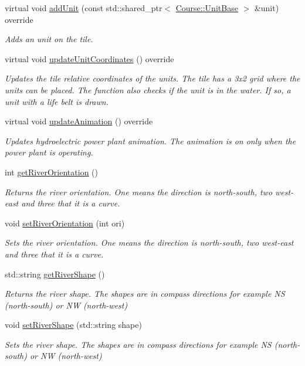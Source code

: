 \begin{DoxyCompactItemize}
virtual void \hyperlink{class_student_1_1_river_a93fc1bbc79e0f918d8f8b2e9455709d3}{add\-Unit} (const std\-::shared\-\_\-ptr$<$ \hyperlink{class_course_1_1_unit_base}{Course\-::\-Unit\-Base} $>$ \&unit) override
\begin{DoxyCompactList}\small\item\em Adds an unit on the tile. \end{DoxyCompactList}\item 
virtual void \hyperlink{class_student_1_1_river_aaf133bf15078e138b4b716a45fa67007}{update\-Unit\-Coordinates} () override
\begin{DoxyCompactList}\small\item\em Updates the tile relative coordinates of the units. The tile has a 3x2 grid where the units can be placed. The function also checks if the unit is in the water. If so, a unit with a life belt is drawn. \end{DoxyCompactList}\item 
virtual void \hyperlink{class_student_1_1_river_af2cbaa57c5a4895b7c695219255a486c}{update\-Animation} () override
\begin{DoxyCompactList}\small\item\em Updates hydroelectric power plant animation. The animation is on only when the power plant is operating. \end{DoxyCompactList}\item 
int \hyperlink{class_student_1_1_river_abcf15545a01cd0ea767a7d495f17ed56}{get\-River\-Orientation} ()
\begin{DoxyCompactList}\small\item\em Returns the river orientation. One means the direction is north-\/south, two west-\/east and three that it is a curve. \end{DoxyCompactList}\item 
void \hyperlink{class_student_1_1_river_ab9e66f6bb2745b6c39cf4a72fcf50853}{set\-River\-Orientation} (int ori)
\begin{DoxyCompactList}\small\item\em Sets the river orientation. One means the direction is north-\/south, two west-\/east and three that it is a curve. \end{DoxyCompactList}\item 
std\-::string \hyperlink{class_student_1_1_river_a787ccae2e51f6cf8b15daf2b8f3f133c}{get\-River\-Shape} ()
\begin{DoxyCompactList}\small\item\em Returns the river shape. The shapes are in compass directions for example N\-S (north-\/south) or N\-W (north-\/west) \end{DoxyCompactList}\item 
void \hyperlink{class_student_1_1_river_a18182b30e591b43265053ab57a49f9af}{set\-River\-Shape} (std\-::string shape)
\begin{DoxyCompactList}\small\item\em Sets the river shape. The shapes are in compass directions for example N\-S (north-\/south) or N\-W (north-\/west) \end{DoxyCompactList}\end{DoxyCompactItemize}
